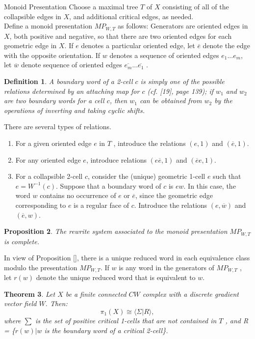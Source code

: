 \documentclass{amsart}
\newtheorem{theorem}{Theorem}[section]
\newtheorem{Definition}[theorem]{Definition}
\newtheorem{proposition}[theorem]{Proposition}
\newenvironment{definition}{\begin{Definition}\normalfont}{\end{Definition}}
\begin{document}
\begin{subsubsection} {Monoid Presentation}
Choose a maximal tree $T$ of $X$ consisting of all of the collapsible edges in $X$, and additional critical edges, as needed.\\
Define a monoid presentation $MP_{W,T}$ as follows: Generators are oriented edges in $X$, both positive and negative, so that there are two oriented edges for each geometric edge in $X$. If $e$ denotes a particular oriented edge, let $\overline{e}$ denote the edge with the opposite orientation. If $w$ denotes a sequence of oriented edges $e_1 . . . e_m$, let $\overline{w}$ denote sequence of oriented edges $\overline{e_m} . . . \overline{e_1}$ .

\begin{definition}
A \textit{boundary word} of a 2-cell $c$ is simply one of the possible relations determined
by an attaching map for $c$ (cf. [19], page 139); if $w_1$ and $w_2$ are two boundary words for a cell $c$, then $w_1$ can be obtained from $w_2$ by the operations of inverting and taking cyclic shifts. 
\end{definition}
There are several types of relations.
\begin{enumerate}
\item For a given oriented edge $e$ in $T$ , introduce the relations $(e, 1)$ and $(\overline{e}, 1)$.
\item For any oriented edge $e$, introduce relations $(e\overline{e}, 1)$ and $(\overline{e}e, 1)$.
\item For a collapsible 2-cell $c$, consider the (unique) geometric 1-cell $e$ such that $e = W^{-1}(c)$. Suppose that a boundary word of $c$ is $ew$. In this case, the word $w$ contains no occurrence of $e$ or $\overline{e}$, since the geometric edge corresponding to $e$ is a regular face of $c$. Introduce the relations
$(e,\overline{w})$ and $(\overline{e},w)$.
\end{enumerate}
\begin{proposition}
The rewrite system associated to the monoid presentation
$MP_{W,T}$ is complete.
\end{proposition}

In view of Proposition [], there is a unique reduced word in each equivalence class modulo the presentation $MP_{W,T}$. If $w$ is any word in the generators of $MP_{W,T}$ , let $r(w)$ denote the unique reduced word that is equivalent to $w$. 
\end{subsubsection}

\begin{theorem} 
Let $X$ be a finite connected $CW$ complex with a discrete gradient vector field $W$. Then:
\begin{equation}
\pi_1(X) \cong \langle \Sigma | R \rangle,
\end{equation}
where $\sum$ is the set of positive critical 1-cells that are not contained in $T$ , and
R = \{$r(w)|w$ is the boundary word of a critical 2-cell\}.
\end{theorem}
\end{document}

